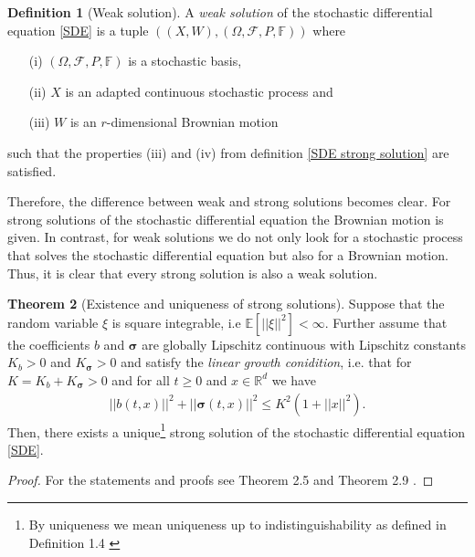 \documentclass[11pt,titlepage]{article}
\newcommand{\R}{\mathbb{R}} %
\newcommand{\E}{\mathbb{E}} %
\newcommand{\abs}[1]{{\left| #1 \right|}}
\theoremstyle{definition}
\newtheorem{theorem}{Theorem}[section]
\newtheorem{definition}[theorem]{Definition}
\theoremstyle{remark}
\begin{document}
	\begin{definition}[Weak solution]
		A \textsl{weak solution} of the stochastic differential equation \ref{SDE} is a tuple 
		$((X,W),(\Omega, \mathcal{F}, P,\mathbb{F}))$ where
		\begin{itemize}
			\item[(i)] $(\Omega, \mathcal{F}, P,\mathbb{F})$ is a stochastic basis,
			\item[(ii)] $X$ is an adapted continuous stochastic process and 
			\item[(iii)] $W$ is an $r$-dimensional Brownian motion
		\end{itemize}
		such that the properties (iii) and (iv) from definition 
		\ref{SDE strong solution} are satisfied.
	\end{definition}
	
	Therefore, the difference between weak and strong solutions becomes clear.
	For strong solutions of the stochastic differential equation the Brownian motion is given. 
	In contrast, for weak solutions we do not only look for a stochastic process that solves 
	the stochastic differential equation but also for a Brownian motion. 
	Thus, it is clear that every strong solution is also a weak solution. 
	
	\begin{theorem}[Existence and uniqueness of strong solutions]\label{Strong sol ex un}
		Suppose that the random variable $\xi$ is square integrable, i.e $\E[\abs{\abs{\xi}}^2]< \infty$. Further assume that the coefficients $b$ and $\boldsymbol{\sigma}$ are globally Lipschitz continuous with Lipschitz constants $K_b>0$ and $K_{\boldsymbol{\sigma}}>0$ 
		and satisfy the \textsl{linear growth conidition}, i.e. that 
		for $K=K_b + K_{\boldsymbol{\sigma}}>0$ and for all $t\geq 0$ and $x\in\R^d$ we have
		\begin{align}
			\abs{\abs{b(t, x)}}^2 + \abs{\abs{\boldsymbol{\sigma}(t,x)}}^2 \leq K^2 (1+\abs{\abs{x}}^2).\label{SDE Zusatzannahme}
		\end{align}
		Then, there exists a unique\footnote{By uniqueness we mean uniqueness up to indistinguishability as defined in Definition 1.4 \cite{StoProSchmidt2021}} strong solution of the stochastic differential equation \ref{SDE}.
	\end{theorem}

	\begin{proof}
		For the statements and proofs see Theorem 2.5 and Theorem 2.9 
		\cite{Karatzas2012}.
	\end{proof}
	
\end{document}
